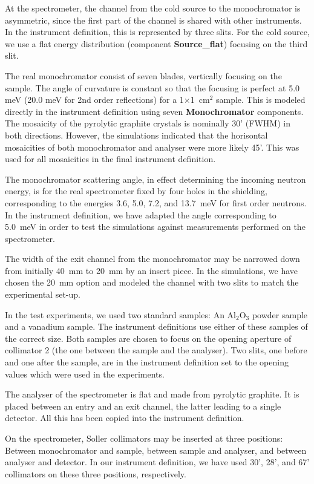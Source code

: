 At the spectrometer, the channel from the cold source
to the monochromator is asymmetric, since the first
part of the channel is shared with other instruments.
In the instrument definition, this is represented by
three slits.
For the cold source, we use a flat energy
distribution (component {\bf Source\_flat})
focusing on the third slit.

The real monochromator consist of seven blades, vertically focusing on
the sample. The angle of curvature is constant so that the focusing is
perfect at 5.0 meV (20.0 meV for 2nd order reflections) for a 1$\times$1~cm$^2$
sample. This is modeled directly in the instrument definition using
seven {\bf Monochromator} components. The mosaicity of the pyrolytic
graphite crystals is nominally 30' (FWHM) in both directions.  However, the
simulations indicated that the horisontal mosaicities of both
monochromator and analyser were more likely 45'. This was used for all
mosaicities in the final instrument definition.

The monochromator scattering angle, in effect determining the incoming
neutron energy, is for the real spectrometer fixed by four holes in the
shielding, corresponding to the energies 3.6, 5.0, 7.2, and 13.7~meV for
first order neutrons.  In the instrument definition, we have adapted the
angle corresponding to 5.0~meV in order to test the simulations against
measurements performed on the spectrometer.

The width of the exit channel from the monochromator may
be narrowed down from initially 40~mm
to 20~mm by an insert piece. In the simulations, we have chosen
the 20~mm option and modeled the channel with two slits to match
the experimental set-up.

In the test experiments, we used two standard samples:
An Al$_2$O$_3$ powder sample and a vanadium sample. The instrument
definitions use either of these samples of the correct
size. Both samples are chosen to focus on the opening aperture of
collimator 2 (the one between the sample and the analyser).
Two slits, one before and one after the sample,
are in the instrument definition set to the opening values which
were used in the experiments.

The analyser of the spectrometer is flat and made from
pyrolytic graphite. It is placed between an entry and
an exit channel, the latter leading to a single detector.
All this has been copied into the instrument definition.

On the spectrometer, Soller collimators may be inserted
at three positions: Between monochromator and sample,
between sample and analyser, and between analyser and detector.
In our instrument definition, we have used 30', 28', and 67' collimators
on these three positions, respectively.

